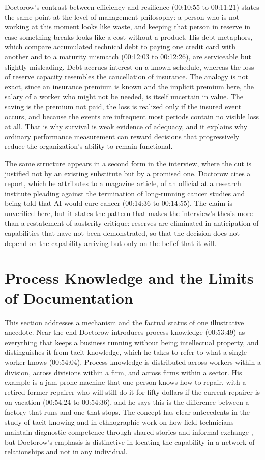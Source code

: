 \documentclass[12pt]{article}
\newcommand{\ts}[1]{(#1)}
\begin{document}
Doctorow's contrast between efficiency and resilience \ts{00:10:55 to 00:11:21} states the same point at the level of management philosophy: a person who is not working at this moment looks like waste, and keeping that person in reserve in case something breaks looks like a cost without a product. His debt metaphors, which compare accumulated technical debt to paying one credit card with another and to a maturity mismatch \ts{00:12:03 to 00:12:26}, are serviceable but slightly misleading. Debt accrues interest on a known schedule, whereas the loss of reserve capacity resembles the cancellation of insurance. The analogy is not exact, since an insurance premium is known and the implicit premium here, the salary of a worker who might not be needed, is itself uncertain in value. The saving is the premium not paid, the loss is realized only if the insured event occurs, and because the events are infrequent most periods contain no visible loss at all. That is why survival is weak evidence of adequacy, and it explains why ordinary performance measurement can reward decisions that progressively reduce the organization's ability to remain functional.

The same structure appears in a second form in the interview, where the cut is justified not by an existing substitute but by a promised one. Doctorow cites a report, which he attributes to a magazine article, of an official at a research institute pleading against the termination of long-running cancer studies and being told that AI would cure cancer \ts{00:14:36 to 00:14:55}. The claim is unverified here, but it states the pattern that makes the interview's thesis more than a restatement of austerity critique: reserves are eliminated in anticipation of capabilities that have not been demonstrated, so that the decision does not depend on the capability arriving but only on the belief that it will.

\section{Process Knowledge and the Limits of Documentation}

This section addresses a mechanism and the factual status of one illustrative anecdote. Near the end Doctorow introduces process knowledge \ts{00:53:49} as everything that keeps a business running without being intellectual property, and distinguishes it from tacit knowledge, which he takes to refer to what a single worker knows \ts{00:54:04}. Process knowledge is distributed across workers within a division, across divisions within a firm, and across firms within a sector. His example is a jam-prone machine that one person knows how to repair, with a retired former repairer who will still do it for fifty dollars if the current repairer is on vacation \ts{00:54:24 to 00:54:36}, and he says this is the difference between a factory that runs and one that stops. The concept has clear antecedents in the study of tacit knowing \cite{polanyi} and in ethnographic work on how field technicians maintain diagnostic competence through shared stories and informal exchange \cite{orr}, but Doctorow's emphasis is distinctive in locating the capability in a network of relationships and not in any individual.
\end{document}
